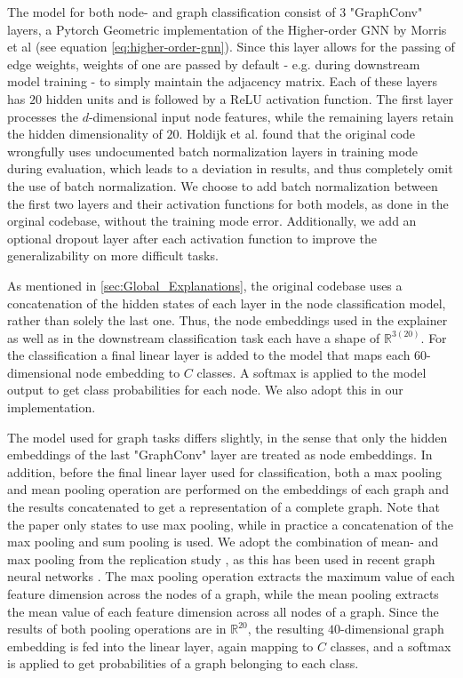The model for both node- and graph classification consist of $3$ "GraphConv" layers, a Pytorch Geometric implementation of the Higher-order GNN by Morris et al \cite{morris2019weisfeiler} (see equation \ref{eq:higher-order-gnn}). Since this layer allows for the passing of edge weights, weights of one are passed by default - e.g. during downstream model training - to simply maintain the adjacency matrix. Each of these layers has $20$ hidden units and is followed by a ReLU activation function. The first layer processes the $d$-dimensional input node features, while the remaining layers retain the hidden dimensionality of $20$. Holdijk et al. \cite{holdijk2021re} found that the original code wrongfully uses undocumented batch normalization layers in training mode during evaluation, which leads to a deviation in results, and thus completely omit the use of batch normalization. We choose to add batch normalization between the first two layers and their activation functions for both models, as done in the orginal codebase, without the training mode error. Additionally, we add an optional dropout layer after each activation function to improve the generalizability on more difficult tasks.

As mentioned in \ref{sec:Global_Explanations}, the original codebase uses a concatenation of the hidden states of each layer in the node classification model, rather than solely the last one. Thus, the node embeddings used in the explainer as well as in the downstream classification task each have a shape of $\mathbb{R}^{3(20)}$. For the classification a final linear layer is added to the model that maps each $60$-dimensional node embedding to $C$ classes. A softmax is applied to the model output to get class probabilities for each node. We also adopt this in our implementation. 

The model used for graph tasks differs slightly, in the sense that only the hidden embeddings of the last "GraphConv" layer are treated as node embeddings. In addition, before the final linear layer used for classification, both a max pooling and mean pooling operation are performed on the embeddings of each graph and the results concatenated to get a representation of a complete graph. Note that the paper only states to use max pooling, while in practice a concatenation of the max pooling and sum pooling is used. We adopt the combination of mean- and max pooling from the replication study \cite{holdijk2021re}, as this has been used in recent graph neural networks \cite{simonovsky2017dynamic} \cite{ma2021unsupervised} \cite{zhao2023faithful}. The max pooling operation extracts the maximum value of each feature dimension across the nodes of a graph, while the mean pooling extracts the mean value of each feature dimension across all nodes of a graph. Since the results of both pooling operations are in $\mathbb{R}^{20}$, the resulting $40$-dimensional graph embedding is fed into the linear layer, again mapping to $C$ classes, and a softmax is applied to get probabilities of a graph belonging to each class.\bigskip

